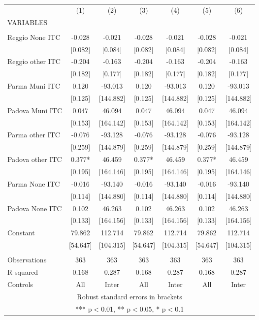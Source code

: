 \begin{tabular}{lcccccc} \hline
 & (1) & (2) & (3) & (4) & (5) & (6) \\
VARIABLES &  &  &  &  &  &  \\ \hline
 &  &  &  &  &  &  \\
Reggio None ITC & -0.028 & -0.021 & -0.028 & -0.021 & -0.028 & -0.021 \\
 & [0.082] & [0.084] & [0.082] & [0.084] & [0.082] & [0.084] \\
Reggio other ITC & -0.204 & -0.163 & -0.204 & -0.163 & -0.204 & -0.163 \\
 & [0.182] & [0.177] & [0.182] & [0.177] & [0.182] & [0.177] \\
Parma Muni ITC & 0.120 & -93.013 & 0.120 & -93.013 & 0.120 & -93.013 \\
 & [0.125] & [144.882] & [0.125] & [144.882] & [0.125] & [144.882] \\
Padova Muni ITC & 0.047 & 46.094 & 0.047 & 46.094 & 0.047 & 46.094 \\
 & [0.153] & [164.142] & [0.153] & [164.142] & [0.153] & [164.142] \\
Parma other ITC & -0.076 & -93.128 & -0.076 & -93.128 & -0.076 & -93.128 \\
 & [0.259] & [144.879] & [0.259] & [144.879] & [0.259] & [144.879] \\
Padova other ITC & 0.377* & 46.459 & 0.377* & 46.459 & 0.377* & 46.459 \\
 & [0.195] & [164.146] & [0.195] & [164.146] & [0.195] & [164.146] \\
Parma None ITC & -0.016 & -93.140 & -0.016 & -93.140 & -0.016 & -93.140 \\
 & [0.114] & [144.880] & [0.114] & [144.880] & [0.114] & [144.880] \\
Padova None ITC & 0.102 & 46.263 & 0.102 & 46.263 & 0.102 & 46.263 \\
 & [0.133] & [164.156] & [0.133] & [164.156] & [0.133] & [164.156] \\
Constant & 79.862 & 112.714 & 79.862 & 112.714 & 79.862 & 112.714 \\
 & [54.647] & [104.315] & [54.647] & [104.315] & [54.647] & [104.315] \\
 &  &  &  &  &  &  \\
Observations & 363 & 363 & 363 & 363 & 363 & 363 \\
R-squared & 0.168 & 0.287 & 0.168 & 0.287 & 0.168 & 0.287 \\
 Controls & All & Inter & All & Inter & All & Inter \\ \hline
\multicolumn{7}{c}{ Robust standard errors in brackets} \\
\multicolumn{7}{c}{ *** p$<$0.01, ** p$<$0.05, * p$<$0.1} \\
\end{tabular}
